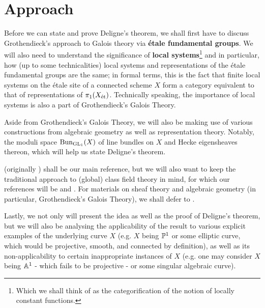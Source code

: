 	\section{Approach}
	    Before we can state and prove Deligne's theorem, we shall first have to discuss Grothendieck's approach to Galois theory via \textbf{\'etale fundamental groups}. We will also need to understand the significance of \textbf{local systems}\footnote{Which we shall think of as the categorification of the notion of locally constant functions.} and in particular, how (up to some technicalities) local systems and representations of the \'etale fundamental groups are the same; in formal terms, this is the fact that finite local systems on the \'etale site of a connected scheme $X$ form a category equivalent to that of representations of $\pi_1(X_{\et})$. Technically speaking, the importance of local systems is also a part of Grothendieck's Galois Theory. 
	    
	    Aside from Grothendieck's Galois Theory, we will also be making use of various constructions from algebraic geometry as well as representation theory. Notably, the moduli space $\Bun_{\GL_1}(X)$ of line bundles on $X$ and Hecke eigensheaves thereon, which will help us state Deligne's theorem. 
	    
	    \cite{tendler_2015_geometric_class_field_theory} (originally \cite{tendler_2010_geometric_class_field_theory_original}) shall be our main reference, but we will also want to keep the traditional approach to (global) class field theory in mind, for which our references will be \cite[Chapter VI]{neukirch_2010_algebraic_number_theory} and \cite[Chapter VIII]{neukirch_1999_cohomology_of_number_field}. For materials on sheaf theory and algebraic geometry (in particular, Grothendieck's Galois Theory), we shall defer to \cite{stacks}. 
	    
	    Lastly, we not only will present the idea as well as the proof of Deligne's theorem, but we will also be analysing the applicability of the result to various explicit examples of the underlying curve $X$ (e.g. $X$ being $\P^1$ or some elliptic curve, which would be projective, smooth, and connected by definition), as well as its non-applicability to certain inappropriate instances of $X$ (e.g. one may consider $X$ being $\A^1$ - which fails to be projective - or some singular algebraic curve).
	
	\printbibliography

